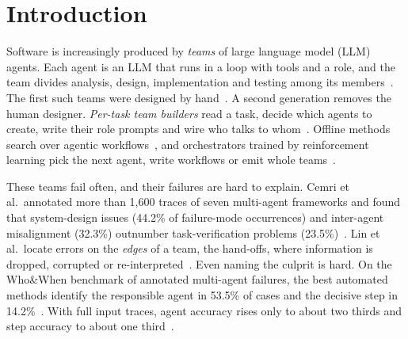 \documentclass[pdflatex,sn-mathphys-num]{sn-jnl}
\theoremstyle{thmstyleone}%
\theoremstyle{thmstyletwo}%
\theoremstyle{thmstylethree}%
\begin{document}

\maketitle

\section{Introduction}\label{sec:introduction}

Software is increasingly produced by \emph{teams} of large language model
(LLM) agents. Each agent is an LLM that runs in a loop with tools and a role,
and the team divides analysis, design, implementation and testing among its
members~\cite{he2025lma,liu2024agents4se}. The first such teams were designed
by hand~\cite{hong2024metagpt,qian2024chatdev,dong2024selfcollab}. A second
generation removes the human designer. \emph{Per-task team builders} read a
task, decide which agents to create, write their role prompts and wire who
talks to whom~\cite{song2024captain,chen2024autoagents,zhang2025metaagent,ke2025maszero}.
Offline methods search over agentic
workflows~\cite{hu2025adas,zhang2025aflow,zhuge2024gptswarm}, and orchestrators
trained by reinforcement learning pick the next agent, write workflows or emit
whole teams~\cite{dang2025puppeteer,nielsen2026conductor,ke2026masorchestra}.

These teams fail often, and their failures are hard to explain. Cemri et
al.\ annotated more than 1{,}600 traces of seven multi-agent frameworks and
found that system-design issues (44.2\% of failure-mode occurrences) and
inter-agent misalignment (32.3\%) outnumber task-verification problems
(23.5\%)~\cite{cemri2025mast}. Lin et al.\ locate errors on the \emph{edges} of
a team, the hand-offs, where information is dropped, corrupted or
re-interpreted~\cite{lin2026agentask}. Even naming the culprit is hard. On the
Who\&When benchmark of annotated multi-agent failures, the best automated
methods identify the responsible agent in 53.5\% of cases and the decisive step
in 14.2\%~\cite{zhang2025whowhen}. With full input traces, agent accuracy rises
only to about two thirds and step accuracy to about one
third~\cite{chen2026traceelephant}.
\end{document}
